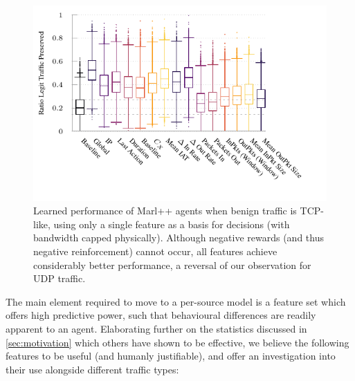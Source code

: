 \documentclass[conference, a4paper, 10pt, times]{IEEEtran}
\begin{document}
\begin{figure}
	\centering
	\includegraphics[width=\linewidth]{../plots/ftprep-tcp-cap-box}
	\vspace{-1.2cm}
	\caption{
		Learned performance of Marl++ agents when benign traffic is TCP-like, using only a single feature as a basis for decisions (with bandwidth capped physically).
		Although negative rewards (and thus negative reinforcement) cannot occur, all features achieve considerably better performance, a reversal of our observation for UDP traffic.
		\label{fig:tcp-cap-feature-plots}
	}
\end{figure}

The main element required to move to a per-source model is a feature set which offers high predictive power, such that behavioural differences are readily apparent to an agent.
Elaborating further on the statistics discussed in \cref{sec:motivation} which others have shown to be effective, we believe the following features to be useful (and humanly justifiable), and offer an investigation into their use alongside different traffic types:
\end{document}
